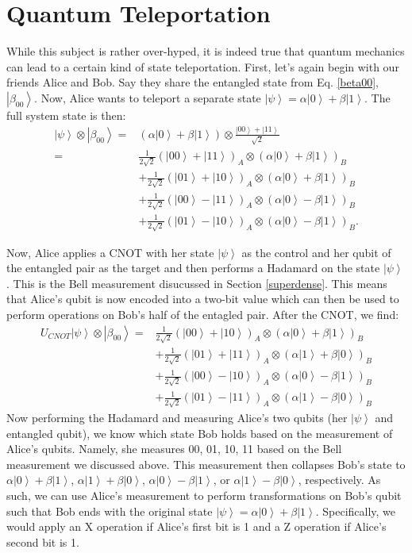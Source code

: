 \documentclass[11pt]{article} %
\newcommand{\ket}[1]{\left|#1\right\rangle}
\begin{document}
\section{Quantum Teleportation}
While this subject is rather over-hyped, it is indeed true that quantum mechanics can lead to a certain kind of state teleportation. First, let's again begin with our friends Alice and Bob. Say they share the entangled state from Eq. \ref{beta00}, $\ket{\beta_{00}}$. Now, Alice wants to teleport a separate state $\ket{\psi}=\alpha\ket{0}+\beta\ket{1}$. The full system state is then:
\begin{align}
    \ket{\psi}\otimes\ket{\beta_{00}} =&\left(\alpha\ket{0}+\beta\ket{1}\right)\otimes\frac{\ket{00}+\ket{11}}{\sqrt{2}}\\
    =&\frac{1}{2\sqrt{2}}(\ket{00}+\ket{11})_A\otimes\left(\alpha\ket{0}+\beta\ket{1}\right)_B\nonumber\\
    &+\frac{1}{2\sqrt{2}}(\ket{01}+\ket{10})_A\otimes\left(\alpha\ket{0}+\beta\ket{1}\right)_B\nonumber\\
    &+\frac{1}{2\sqrt{2}}(\ket{00}-\ket{11})_A\otimes\left(\alpha\ket{0}-\beta\ket{1}\right)_B\nonumber\\
    &+\frac{1}{2\sqrt{2}}(\ket{01}-\ket{10})_A\otimes\left(\alpha\ket{0}-\beta\ket{1}\right)_B.
\end{align}

Now, Alice applies a CNOT with her state $\ket{\psi}$ as the control and her qubit of the entangled pair as the target and then performs a Hadamard on the state $\ket{\psi}$. This is the Bell measurement disucussed in Section \ref{superdense}. This means that Alice's qubit is now encoded into a two-bit value which can then be used to perform operations on Bob's half of the entagled pair. After the CNOT, we find:
\begin{align}
    U_{CNOT}\ket{\psi}\otimes\ket{\beta_{00}} 
    =&\frac{1}{2\sqrt{2}}(\ket{00}+\ket{10})_A\otimes\left(\alpha\ket{0}+\beta\ket{1}\right)_B\nonumber\\
    &+\frac{1}{2\sqrt{2}}(\ket{01}+\ket{11})_A\otimes\left(\alpha\ket{1}+\beta\ket{0}\right)_B\nonumber\\
    &+\frac{1}{2\sqrt{2}}(\ket{00}-\ket{10})_A\otimes\left(\alpha\ket{0}-\beta\ket{1}\right)_B\nonumber\\
    &+\frac{1}{2\sqrt{2}}(\ket{01}-\ket{11})_A\otimes\left(\alpha\ket{1}-\beta\ket{0}\right)_B
\end{align}
Now performing the Hadamard and measuring Alice's two qubits (her $\ket{\psi}$ and entangled qubit), we know which state Bob holds based on the measurement of Alice's qubits. Namely, she measures 00, 01, 10, 11 based on the Bell measurement we discussed above. This measurement then collapses Bob's state to $\alpha\ket{0}+\beta\ket{1}$, $\alpha\ket{1}+\beta\ket{0}$, $\alpha\ket{0}-\beta\ket{1}$, or $\alpha\ket{1}-\beta\ket{0}$, respectively. As such, we can use Alice's measurement to perform transformations on Bob's qubit such that Bob ends with the original state $\ket{\psi}=\alpha\ket{0}+\beta\ket{1}$. Specifically, we would apply an X operation if Alice's first bit is 1 and a Z operation if Alice's second bit is 1.
\end{document}
